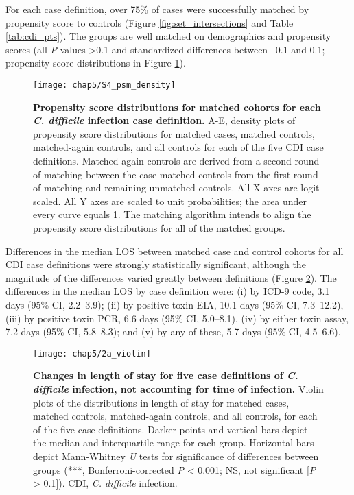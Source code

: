 For each case definition, over 75\% of cases were successfully matched by propensity score to controls (Figure \ref{fig:set_intersections} and Table \ref{tab:cdi_pts}). The groups are well matched on demographics and propensity scores (all \emph{P} values >0.1 and standardized differences between –0.1 and 0.1; propensity score distributions in Figure \ref{fig:psm_density}).
\begin{figure}[htb]
  \texttt{[image: chap5/S4\_psm\_density]}
  \caption[Propensity score distributions for matched cohorts for each \emph{C. difficile} infection case definition]{
    \textbf{Propensity score distributions for matched cohorts for each \emph{C. difficile} infection case definition.} A-E, density plots of propensity score distributions for matched cases, matched controls, matched-again controls, and all controls for each of the five CDI case definitions. Matched-again controls are derived from a second round of matching between the case-matched controls from the first round of matching and remaining unmatched controls. All X axes are logit-scaled. All Y axes are scaled to unit probabilities; the area under every curve equals 1. The matching algorithm intends to align the propensity score distributions for all of the matched groups.
  }
  \label{fig:psm_density}
\end{figure}
Differences in the median LOS between matched case and control cohorts for all CDI case definitions were strongly statistically significant, although the magnitude of the differences varied greatly between definitions (Figure \ref{fig:violin}). The differences in the median LOS by case definition were: (i) by ICD-9 code, 3.1 days (95\% CI, 2.2–3.9); (ii) by positive toxin EIA, 10.1 days (95\% CI, 7.3–12.2), (iii) by positive toxin PCR, 6.6 days (95\% CI, 5.0–8.1), (iv) by either toxin assay, 7.2 days (95\% CI, 5.8–8.3); and (v) by any of these, 5.7 days (95\% CI, 4.5–6.6). 
\begin{figure}[htb]
  \texttt{[image: chap5/2a\_violin]}
  \caption[Changes in length of stay for five case definitions of \emph{C. difficile} infection, not accounting for time of infection]{
    \textbf{Changes in length of stay for five case definitions of \emph{C. difficile} infection, not accounting for time of infection.} Violin plots of the distributions in length of stay for matched cases, matched controls, matched-again controls, and all controls, for each of the five case definitions. Darker points and vertical bars depict the median and interquartile range for each group. Horizontal bars depict Mann-Whitney \emph{U} tests for significance of differences between groups (***, Bonferroni-corrected \emph{P} < 0.001; NS, not significant [\emph{P} > 0.1]). CDI, \emph{C. difficile} infection.
  }
  \label{fig:violin}
\end{figure}
